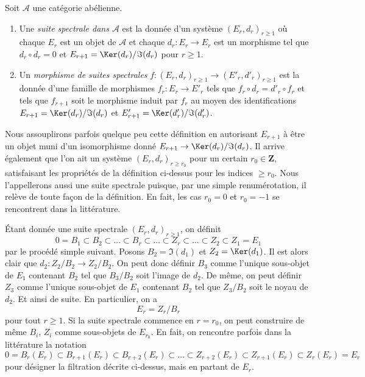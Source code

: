 \begin{definition}
\label{definition-spectral-sequence}
Soit $\mathcal{A}$ une catégorie abélienne.
\begin{enumerate}
\item Une {\it suite spectrale dans $\mathcal{A}$} est la donnée d'un
système $(E_r, d_r)_{r \geq 1}$ où chaque $E_r$ est un objet
de $\mathcal{A}$ et chaque $d_r : E_r \to E_r$ est un morphisme tel
que $d_r \circ d_r = 0$ et $E_{r + 1} = \Ker(d_r)/\Im(d_r)$
pour $r \geq 1$.
\item Un {\it morphisme de suites spectrales}
$f : (E_r, d_r)_{r \geq 1} \to (E'_r, d'_r)_{r \geq 1}$ est
la donnée d'une famille de morphismes $f_r : E_r \to E'_r$ tels que
$f_r \circ d_r = d'_r \circ f_r$ et tels que $f_{r + 1}$
soit le morphisme induit par $f_r$ au moyen des identifications
$E_{r + 1} = \Ker(d_r)/\Im(d_r)$
et
$E'_{r + 1} = \Ker(d'_r)/\Im(d'_r)$.
\end{enumerate}
\end{definition}

\noindent
Nous assouplirons parfois quelque peu cette définition en autorisant $E_{r + 1}$
à être un objet muni d'un isomorphisme donné
$E_{r + 1} \to \Ker(d_r)/\Im(d_r)$.
Il arrive également que l'on ait un système $(E_r, d_r)_{r \geq r_0}$
pour un certain $r_0 \in \mathbf{Z}$, satisfaisant les propriétés de la définition ci-dessus
pour les indices $\geq r_0$. Nous l'appellerons aussi une suite spectrale puisque,
par une simple renumérotation, il relève de toute façon de la définition.
En fait, les cas $r_0 = 0$ et $r_0 = -1$ se rencontrent dans la littérature.

\medskip\noindent
Étant donnée une suite spectrale $(E_r, d_r)_{r \geq 1}$, on définit
$$
0 = B_1 \subset B_2 \subset \ldots \subset B_r \subset \ldots
\subset Z_r \subset \ldots \subset Z_2 \subset Z_1 = E_1
$$
par le procédé simple suivant. Posons $B_2 = \Im(d_1)$
et $Z_2 = \Ker(d_1)$. Il est alors clair que
$d_2 : Z_2/B_2 \to Z_2/B_2$. On peut donc définir $B_3$ comme l'unique
sous-objet de $E_1$ contenant $B_2$ tel que $B_3/B_2$ soit l'image
de $d_2$. De même, on peut définir $Z_3$ comme l'unique sous-objet de
$E_1$ contenant $B_2$ tel que $Z_3/B_2$ soit le noyau de $d_2$.
Et ainsi de suite. En particulier, on a
$$
E_r = Z_r/B_r
$$
pour tout $r \geq 1$. Si la suite spectrale commence en $r = r_0$,
on peut construire de même $B_i$, $Z_i$ comme sous-objets de $E_{r_0}$.
En fait, on rencontre parfois dans la littérature la notation
$$
0 = B_r(E_r) \subset B_{r + 1}(E_r) \subset B_{r + 2}(E_r) \subset \ldots
\subset Z_{r + 2}(E_r) \subset Z_{r + 1}(E_r) \subset Z_r(E_r) = E_r
$$
pour désigner la filtration décrite ci-dessus, mais en partant de $E_r$.

